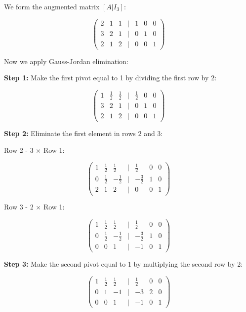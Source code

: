 We form the augmented matrix \([A|I_3]\):

\[
    \begin{pmatrix}
    2 & 1 & 1 & | & 1 & 0 & 0 \\
    3 & 2 & 1 & | & 0 & 1 & 0 \\
    2 & 1 & 2 & | & 0 & 0 & 1
    \end{pmatrix}
\]

Now we apply Gauss-Jordan elimination:
\vspace{\baselineskip}

\textbf{Step 1:} Make the first pivot equal to 1 by dividing the first row by 2:

\[
    \begin{pmatrix}
    1 & \frac{1}{2} & \frac{1}{2} & | & \frac{1}{2} & 0 & 0 \\
    3 & 2 & 1 & | & 0 & 1 & 0 \\
    2 & 1 & 2 & | & 0 & 0 & 1
    \end{pmatrix}
\]

\textbf{Step 2:} Eliminate the first element in rows 2 and 3:

Row 2 - 3 \(\times\) Row 1:

\[
    \begin{pmatrix}
    1 & \frac{1}{2} & \frac{1}{2} & | & \frac{1}{2} & 0 & 0 \\
    0 & \frac{1}{2} & -\frac{1}{2} & | & -\frac{3}{2} & 1 & 0 \\
    2 & 1 & 2 & | & 0 & 0 & 1
    \end{pmatrix}
\]

Row 3 - 2 \(\times\) Row 1:

\[
    \begin{pmatrix}
    1 & \frac{1}{2} & \frac{1}{2} & | & \frac{1}{2} & 0 & 0 \\
    0 & \frac{1}{2} & -\frac{1}{2} & | & -\frac{3}{2} & 1 & 0 \\
    0 & 0 & 1 & | & -1 & 0 & 1
    \end{pmatrix}
\]

\textbf{Step 3:} Make the second pivot equal to 1 by multiplying the second row by 2:

\[
    \begin{pmatrix}
    1 & \frac{1}{2} & \frac{1}{2} & | & \frac{1}{2} & 0 & 0 \\
    0 & 1 & -1 & | & -3 & 2 & 0 \\
    0 & 0 & 1 & | & -1 & 0 & 1
    \end{pmatrix}
\]

